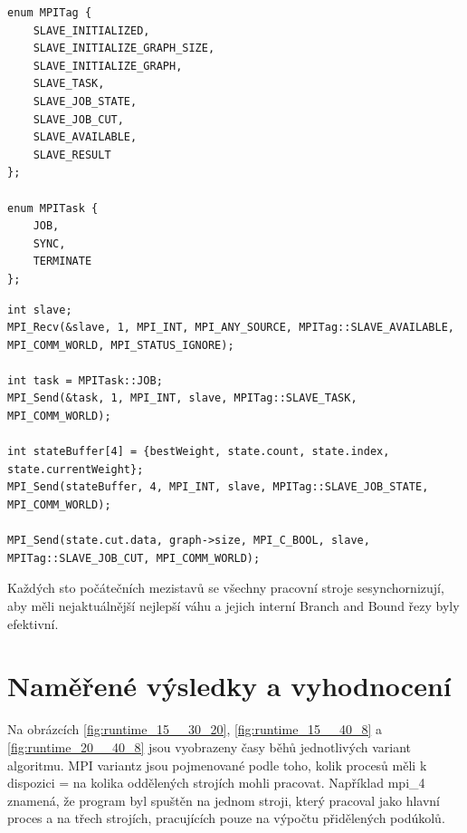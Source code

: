 \documentclass[epsf,epic,eepic,eepicemu]{article}\oddsidemargin=-5mm
\begin{document}
\begin{lstlisting}[float,label=lst:mpitags, caption={MPI tagy a specifické tasky}]
enum MPITag {
    SLAVE_INITIALIZED,
    SLAVE_INITIALIZE_GRAPH_SIZE,
    SLAVE_INITIALIZE_GRAPH,
    SLAVE_TASK,
    SLAVE_JOB_STATE,
    SLAVE_JOB_CUT,
    SLAVE_AVAILABLE,
    SLAVE_RESULT
};

enum MPITask {
    JOB,
    SYNC,
    TERMINATE
};
\end{lstlisting}

\begin{lstlisting}[float,label=lst:mpisendjob, caption={MPI tagy a specifické tasky}]
int slave;
MPI_Recv(&slave, 1, MPI_INT, MPI_ANY_SOURCE, MPITag::SLAVE_AVAILABLE, MPI_COMM_WORLD, MPI_STATUS_IGNORE);

int task = MPITask::JOB;
MPI_Send(&task, 1, MPI_INT, slave, MPITag::SLAVE_TASK, MPI_COMM_WORLD);

int stateBuffer[4] = {bestWeight, state.count, state.index, state.currentWeight};
MPI_Send(stateBuffer, 4, MPI_INT, slave, MPITag::SLAVE_JOB_STATE, MPI_COMM_WORLD);

MPI_Send(state.cut.data, graph->size, MPI_C_BOOL, slave, MPITag::SLAVE_JOB_CUT, MPI_COMM_WORLD);
\end{lstlisting}

Každých sto počátečních mezistavů se všechny pracovní stroje sesynchornizují, aby měli nejaktuálnější nejlepší váhu a jejich interní Branch and Bound řezy byly efektivní.


\section{Naměřené výsledky a vyhodnocení}

Na obrázcích \ref{fig:runtime_15__30_20}, \ref{fig:runtime_15__40_8} a \ref{fig:runtime_20__40_8} jsou vyobrazeny časy běhů jednotlivých variant algoritmu. MPI variantz jsou pojmenované podle toho, kolik procesů měli k dispozici = na kolika oddělených strojích mohli pracovat.
Například mpi\_4 znamená, že program byl spuštěn na jednom stroji, který pracoval jako hlavní proces a na třech strojích, pracujících pouze na výpočtu přidělených podúkolů.
\end{document}
